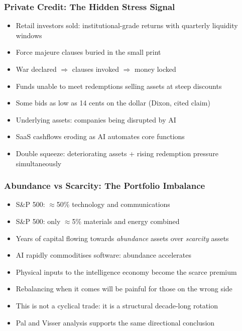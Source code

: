 \begin{frame}[fragile]\frametitle{Private Credit: The Hidden Stress Signal}
  \begin{itemize}
    \item Retail investors sold: institutional-grade returns with quarterly liquidity windows
    \item Force majeure clauses buried in the small print
    \item War declared $\Rightarrow$ clauses invoked $\Rightarrow$ money locked
    \item Funds unable to meet redemptions selling assets at steep discounts
    \item Some bids as low as \alert{14 cents on the dollar} (Dixon, cited claim)
    \item Underlying assets: companies being disrupted by AI
    \item SaaS cashflows eroding as AI automates core functions
    \item Double squeeze: deteriorating assets + rising redemption pressure simultaneously
  \end{itemize}
\end{frame}

\begin{frame}[fragile]\frametitle{Abundance vs Scarcity: The Portfolio Imbalance}
  \begin{itemize}
    \item S\&P 500: $\approx$50\% technology and communications
    \item S\&P 500: only $\approx$5\% materials and energy combined
    \item Years of capital flowing towards \emph{abundance} assets over \emph{scarcity} assets
    \item AI rapidly commoditises software: abundance accelerates
    \item Physical inputs to the intelligence economy become the scarce premium
    \item Rebalancing when it comes will be painful for those on the wrong side
    \item This is not a cyclical trade: it is a structural decade-long rotation
    \item Pal and Visser analysis supports the same directional conclusion
  \end{itemize}
\end{frame}

